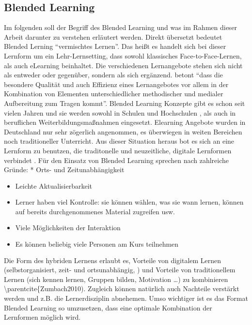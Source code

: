 \documentclass[12pt, bibliography=totoc]{scrartcl}
\begin{document}
\subsection{Blended Learning}\label{blended-learning}

Im folgenden soll der Begriff des Blended Learning und was im Rahmen
dieser Arbeit darunter zu verstehen erläutert werden. Direkt übersetzt
bedeutet Blended Lerning \enquote{vermischtes Lernen}. Das heißt es
handelt sich bei dieser Lernform um ein Lehr-Lernsetting, dass sowohl
klassisches Face-to-Face-Lernen, als auch eLearning beinhaltet. Die
verschiedenen Lernangebote stehen sich nicht als entweder oder
gegenüber, sondern als sich ergänzend.
 betont \enquote{dass die besondere
Qualität und auch Effizienz eines Lernangebotes vor allem in der
Kombination von Elementen unterschiedlicher methodischer und medialer
Aufbereitung zum Tragen kommt}. Blended Learning Konzepte gibt es schon
seit vielen Jahren und sie werden sowohl in Schulen und Hochschulen ,
als auch in beruflichen Weiterbildungsmaßnahmen eingesetzt. Elearning
Angebote wurden in Deutschland nur sehr zögerlich angenommen, es
überwiegen in weiten Bereichen noch traditioneller Unterricht. Aus
dieser Situation heraus bot es sich an eine Lernform zu benutzen, die
traditonelle und neuzeitliche, digitale Lernformen verbindet
. Für den Einsatz von Blended Learning sprechen
nach \textcite{thomas2000evaluating} zahlreiche Gründe: * Orts- und
Zeitunabhängigkeit

\begin{itemize}
\item
  Leichte Aktualisierbarkeit
\item
  Lerner haben viel Kontrolle: sie können wählen, was sie wann lernen,
  können auf bereits durchgenommenes Material zugreifen usw.
\item
  Viele Möglichkeiten der Interaktion
\item
  Es können beliebig viele Personen am Kurs teilnehmen
\end{itemize}

Die Form des hybriden Lernens erlaubt es, Vorteile von digitalem Lernen
(selbstorganisiert, zeit- und ortsunabhängig, ) und Vorteile von
traditionellem Lernen (sich kennen lernen, Gruppen bilden, Motivation
\ldots) zu kombinieren \textbackslash{}parentcite\{Zumbach2010).
Zugleich können natürlich auch Nachteile verstärkt werden und z.B. die
Lernerdisziplin abnehemen. Umso wichtiger ist es das Format Blended
Learning so umzusetzen, dass eine optimale Kombination der Lernformen
möglich wird.
\end{document}
